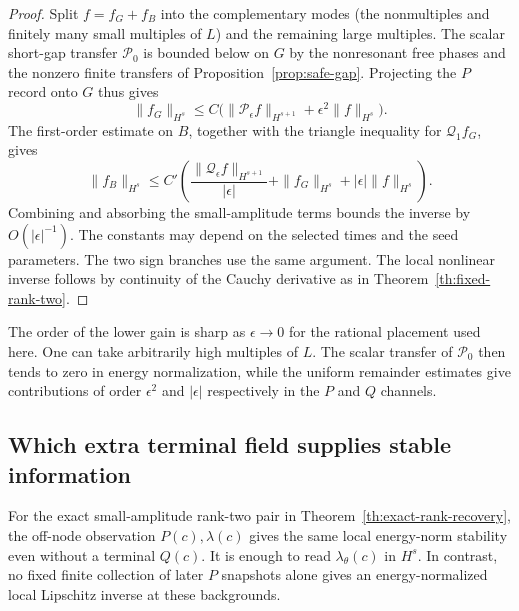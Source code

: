 \begin{proof}
Split $f=f_G+f_B$ into the complementary modes
(the nonmultiples and finitely many small
multiples of $L$) and the remaining large
multiples. The scalar short-gap transfer
$\mathcal P_0$ is bounded below on $G$ by the
nonresonant free phases and the nonzero finite
transfers of Proposition~\ref{prop:safe-gap}.
Projecting the $P$ record onto $G$ thus gives
\[
 \|f_G\|_{H^s}\le C\big(
    \|\mathcal P_\epsilon f\|_{H^{s+1}}+
      \epsilon^2\|f\|_{H^s}\big).
\]
The first-order estimate on $B$, together with
the triangle inequality for $\mathcal Q_1 f_G$,
gives
\[
 \|f_B\|_{H^s}\le C'\left(
   \frac{\|\mathcal Q_\epsilon f\|_{H^{s+1}}}{|\epsilon|}
       +\|f_G\|_{H^s}+|\epsilon|\|f\|_{H^s}\right).
\]
Combining and absorbing the small-amplitude terms
bounds the inverse by $O(|\epsilon|^{-1})$.
The constants may depend on the selected times
and the seed parameters.
The two sign branches use the same argument.
The local nonlinear inverse follows by continuity
of the Cauchy derivative as in
Theorem~\ref{th:fixed-rank-two}.
\end{proof}

The order of the lower gain is sharp as
$\epsilon\to0$ for the rational placement used here.
One can take arbitrarily high multiples of $L$.
The scalar transfer of $\mathcal P_0$ then tends
to zero in energy normalization, while the
uniform remainder estimates give contributions of
order $\epsilon^2$ and $|\epsilon|$ respectively
in the $P$ and $Q$ channels.

\subsection{Which extra terminal field supplies stable information}
\begin{proposition}
\label{prop:rank-two-fields}
For the exact small-amplitude rank-two pair in
Theorem~\ref{th:exact-rank-recovery}, the off-node
observation $P(c),\lambda(c)$ gives the same local
energy-norm stability even without a terminal $Q(c)$.
It is enough to read $\lambda_\theta(c)$ in $H^s$.
In contrast, no fixed finite collection of later $P$
snapshots alone gives an energy-normalized local
Lipschitz inverse at these backgrounds.
\end{proposition}

